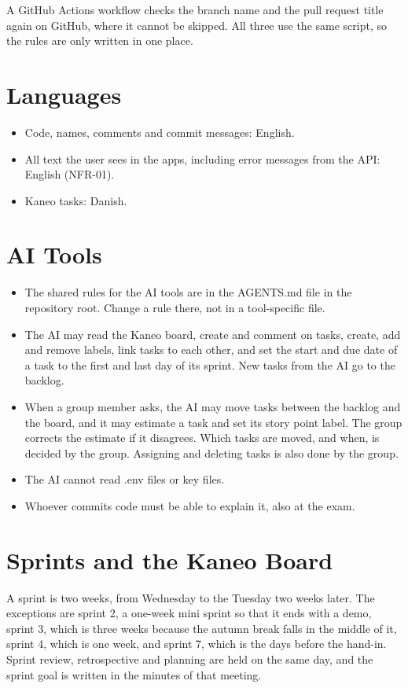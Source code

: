 \documentclass[a4paper,11pt]{article}
\begin{document}
A GitHub Actions workflow checks the branch name and the pull request title again on GitHub, where it cannot be skipped. All three use the same script, so the rules are only written in one place.

\section{Languages}
\begin{itemize}
    \item Code, names, comments and commit messages: English.
    \item All text the user sees in the apps, including error messages from the API: English (NFR-01).
    \item Kaneo tasks: Danish.
\end{itemize}

\section{AI Tools}
\begin{itemize}
    \item The shared rules for the AI tools are in the AGENTS.md file in the repository root. Change a rule there, not in a tool-specific file.
    \item The AI may read the Kaneo board, create and comment on tasks, create, add and remove labels, link tasks to each other, and set the start and due date of a task to the first and last day of its sprint. New tasks from the AI go to the backlog.
    \item When a group member asks, the AI may move tasks between the backlog and the board, and it may estimate a task and set its story point label. The group corrects the estimate if it disagrees. Which tasks are moved, and when, is decided by the group. Assigning and deleting tasks is also done by the group.
    \item The AI cannot read .env files or key files.
    \item Whoever commits code must be able to explain it, also at the exam.
\end{itemize}

\section{Sprints and the Kaneo Board}
A sprint is two weeks, from Wednesday to the Tuesday two weeks later. The exceptions are sprint 2, a one-week mini sprint so that it ends with a demo, sprint 3, which is three weeks because the autumn break falls in the middle of it, sprint 4, which is one week, and sprint 7, which is the days before the hand-in. Sprint review, retrospective and planning are held on the same day, and the sprint goal is written in the minutes of that meeting.
\end{document}

